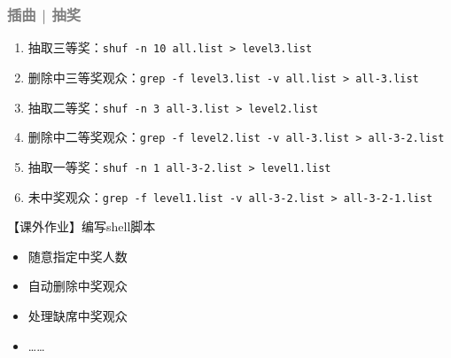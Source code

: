 \begin{frame}[fragile]
  \frametitle{\textcolor{gray}{插曲 | 抽奖}}
    \begin{enumerate}
      \item 抽取三等奖：\verb=shuf -n 10 all.list > level3.list=
      \item 删除中三等奖观众：\verb=grep -f level3.list -v all.list > all-3.list=
      \item 抽取二等奖：\verb=shuf -n 3 all-3.list > level2.list=
      \item 删除中二等奖观众：\verb=grep -f level2.list -v all-3.list > all-3-2.list=
      \item 抽取一等奖：\verb=shuf -n 1 all-3-2.list > level1.list=
      \item 未中奖观众：\verb=grep -f level1.list -v all-3-2.list > all-3-2-1.list=
    \end{enumerate}
  \pause
  \begin{block}{【课外作业】编写shell脚本}
    \begin{itemize}
      \item 随意指定中奖人数
      \item 自动删除中奖观众
      \item 处理缺席中奖观众
      \item ……
    \end{itemize}
  \end{block}
\end{frame}


